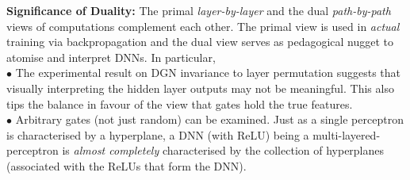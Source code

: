 \textbf{Significance of Duality:} The primal \emph{layer-by-layer} and the dual \emph{path-by-path} views of computations complement each other. The primal view is used in \emph{actual} training via backpropagation and the dual view serves as pedagogical nugget to atomise and interpret DNNs. In particular,\\
$\bullet$ The experimental result on DGN invariance to layer permutation suggests that visually interpreting the hidden layer outputs may not be meaningful. This also tips the balance in favour of the view that gates hold the true features.\\
$\bullet$ Arbitrary gates (not just random) can be examined. Just as a single perceptron is characterised by a hyperplane, a DNN (with ReLU) being a multi-layered-perceptron is \emph{almost completely} characterised by the collection of hyperplanes (associated with the ReLUs that form the DNN).
\begin{table}[h]
\caption{Primal-Dual Viewpoints. ${\color{red}\bm{\dagger}}=$ novelties in this paper.}
\label{tb:primal-dual}
\end{table}

